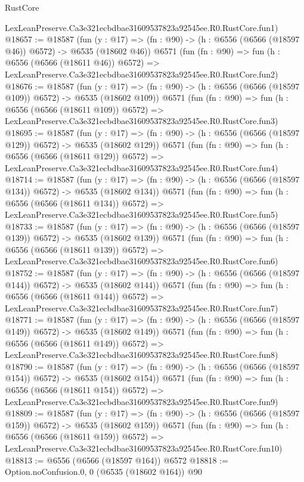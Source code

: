 \begin{lexlean}{RustCore}
\begin{coremodule}
    LexLeanPreserve.Ca3e321ecbdbae31609537823a92545ee.R0.RustCore.fun1)
@18657 := @18587
    (fun (y : @17) => (fn : @90) -> (h : @6556 (@6566 (@18597 @46)) @6572) -> @6535 (@18602 @46))
    @6571
    (fun (fn : @90) =>
    fun (h : @6556 (@6566 (@18611 @46)) @6572) =>
    LexLeanPreserve.Ca3e321ecbdbae31609537823a92545ee.R0.RustCore.fun2)
@18676 := @18587
    (fun (y : @17) => (fn : @90) -> (h : @6556 (@6566 (@18597 @109)) @6572) -> @6535 (@18602 @109))
    @6571
    (fun (fn : @90) =>
    fun (h : @6556 (@6566 (@18611 @109)) @6572) =>
    LexLeanPreserve.Ca3e321ecbdbae31609537823a92545ee.R0.RustCore.fun3)
@18695 := @18587
    (fun (y : @17) => (fn : @90) -> (h : @6556 (@6566 (@18597 @129)) @6572) -> @6535 (@18602 @129))
    @6571
    (fun (fn : @90) =>
    fun (h : @6556 (@6566 (@18611 @129)) @6572) =>
    LexLeanPreserve.Ca3e321ecbdbae31609537823a92545ee.R0.RustCore.fun4)
@18714 := @18587
    (fun (y : @17) => (fn : @90) -> (h : @6556 (@6566 (@18597 @134)) @6572) -> @6535 (@18602 @134))
    @6571
    (fun (fn : @90) =>
    fun (h : @6556 (@6566 (@18611 @134)) @6572) =>
    LexLeanPreserve.Ca3e321ecbdbae31609537823a92545ee.R0.RustCore.fun5)
@18733 := @18587
    (fun (y : @17) => (fn : @90) -> (h : @6556 (@6566 (@18597 @139)) @6572) -> @6535 (@18602 @139))
    @6571
    (fun (fn : @90) =>
    fun (h : @6556 (@6566 (@18611 @139)) @6572) =>
    LexLeanPreserve.Ca3e321ecbdbae31609537823a92545ee.R0.RustCore.fun6)
@18752 := @18587
    (fun (y : @17) => (fn : @90) -> (h : @6556 (@6566 (@18597 @144)) @6572) -> @6535 (@18602 @144))
    @6571
    (fun (fn : @90) =>
    fun (h : @6556 (@6566 (@18611 @144)) @6572) =>
    LexLeanPreserve.Ca3e321ecbdbae31609537823a92545ee.R0.RustCore.fun7)
@18771 := @18587
    (fun (y : @17) => (fn : @90) -> (h : @6556 (@6566 (@18597 @149)) @6572) -> @6535 (@18602 @149))
    @6571
    (fun (fn : @90) =>
    fun (h : @6556 (@6566 (@18611 @149)) @6572) =>
    LexLeanPreserve.Ca3e321ecbdbae31609537823a92545ee.R0.RustCore.fun8)
@18790 := @18587
    (fun (y : @17) => (fn : @90) -> (h : @6556 (@6566 (@18597 @154)) @6572) -> @6535 (@18602 @154))
    @6571
    (fun (fn : @90) =>
    fun (h : @6556 (@6566 (@18611 @154)) @6572) =>
    LexLeanPreserve.Ca3e321ecbdbae31609537823a92545ee.R0.RustCore.fun9)
@18809 := @18587
    (fun (y : @17) => (fn : @90) -> (h : @6556 (@6566 (@18597 @159)) @6572) -> @6535 (@18602 @159))
    @6571
    (fun (fn : @90) =>
    fun (h : @6556 (@6566 (@18611 @159)) @6572) =>
    LexLeanPreserve.Ca3e321ecbdbae31609537823a92545ee.R0.RustCore.fun10)
@18813 := @6556 (@6566 (@18597 @164)) @6572
@18818 := Option.noConfusion.{0, 0} (@6535 (@18602 @164)) @90

\end{coremodule}
\end{lexlean}
